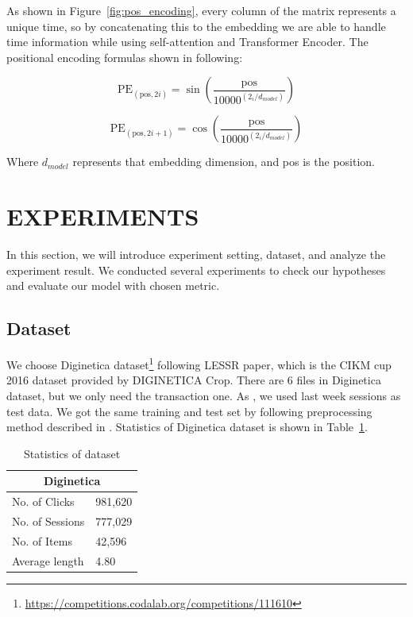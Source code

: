 \documentclass{article}
\begin{document}
As shown in Figure~\ref{fig:pos_encoding},
every column of the matrix represents a unique time,
so by concatenating this to the embedding we are able
to handle time information while using self-attention
and Transformer Encoder. The positional encoding formulas shown in following:

\begin{equation}
    \label{eq:pos_encoding_1}
    \textrm{PE}_(\textrm{pos},2i) = \sin(\frac{\textrm{pos}}{10000^(2_i/d_{model})})
\end{equation}

\begin{equation}
    \label{eq:pos_encoding_2}
    \textrm{PE}_(\textrm{pos},2i+1) = \cos(\frac{\textrm{pos}}{10000^(2_i/d_{model})})
\end{equation}

Where $d_{model}$ represents that embedding dimension,
and pos is the position.


\section{EXPERIMENTS}

In this section, we will introduce experiment setting,
dataset, and analyze the experiment result.
We conducted several experiments to check our hypotheses and evaluate our
model with chosen metric.

\subsection{Dataset}

We choose Diginetica dataset\footnote{\url{https://competitions.codalab.org/competitions/111610}}
following LESSR \cite{chen2020lessr} paper,
which is the CIKM cup 2016 dataset provided by DIGINETICA Crop.
There are 6 files in Diginetica dataset, but we only need the transaction one.
As \cite{chen2020lessr}, we used last week sessions as test data.
We got the same training and test set by following preprocessing method
described in \cite{chen2020lessr}.
Statistics of Diginetica dataset is shown in Table~\ref{data-stats}.

\begin{table}
    \caption{Statistics of dataset}
    \label{data-stats}
    \centering
    \begin{tabular}{ll}
        \toprule
        \multicolumn{2}{c}{Diginetica} \\
        \midrule
        No. of Clicks   & 981,620      \\
        No. of Sessions & 777,029      \\
        No. of Items    & 42,596       \\
        Average length  & 4.80         \\
        \bottomrule
    \end{tabular}
\end{table}
\end{document}
